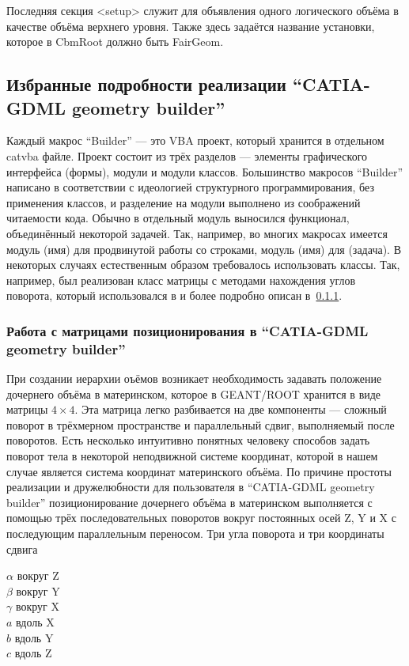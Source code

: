 Последняя секция <setup> служит для объявления одного логического объёма в качестве объёма верхнего уровня. Также здесь задаётся название установки, которое в CbmRoot должно быть FairGeom.

\subsection{Избранные подробности реализации ``CATIA-GDML geometry builder''}\label{sec:BuilderImp}

Каждый макрос ``Builder'' --- это VBA проект, который хранится в отдельном catvba файле. Проект состоит из трёх разделов --- элементы графического интерфейса (формы), модули и модули классов. Большинство макросов ``Builder'' написано в соответствии с идеологией структурного программирования, без применения классов, и разделение на модули выполнено из соображений читаемости кода. Обычно в отдельный модуль выносился функционал, объединённый некоторой задачей. Так, например, во многих макросах имеется модуль \todo (имя) для продвинутой работы со строками, модуль \todo (имя) для \todo (задача). В некоторых случаях естественным образом требовалось использовать классы. Так, например, был реализован класс матрицы с методами нахождения углов поворота, который использовался в \todo и более подробно описан в~\ref{sec:Matrices}.

\subsubsection{Работа с матрицами позиционирования в ``CATIA-GDML geometry builder''}\label{sec:Matrices}

При создании иерархии оъёмов возникает необходимость задавать положение дочернего объёма в материнском, которое в GEANT/ROOT хранится в виде матрицы $4 \times 4$. Эта матрица легко разбивается на две компоненты --- сложный поворот в трёхмерном пространстве и параллельный сдвиг, выполняемый после поворотов. Есть несколько интуитивно понятных человеку способов задать поворот тела в некоторой неподвижной системе координат, которой в нашем случае является система координат материнского объёма. По причине простоты реализации и дружелюбности для пользователя в ``CATIA-GDML geometry builder'' позиционирование дочернего объёма в материнском выполняется с помощью трёх последовательных поворотов вокруг постоянных осей Z, Y и X с последующим параллельным переносом. Три угла поворота и три координаты сдвига

{\centering
$\alpha$ вокруг Z \\
$\beta$ вокруг Y \\
$\gamma$ вокруг X \\
$a$ вдоль X \\
$b$ вдоль Y \\
$c$ вдоль Z \\
}

